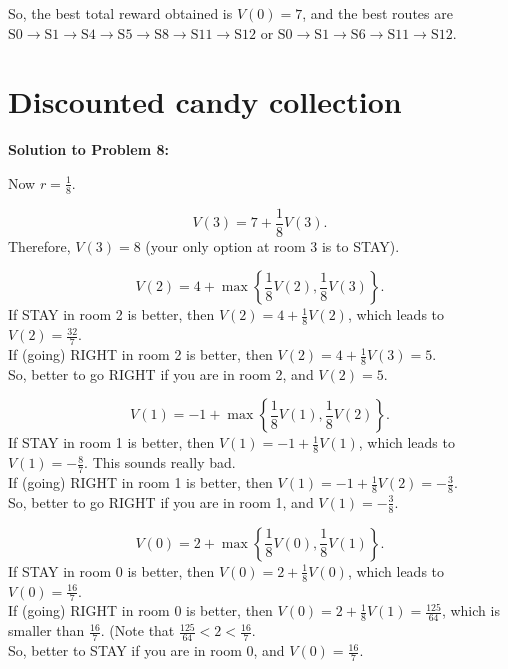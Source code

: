 \documentclass[a4paper, 12pt]{article}
\begin{document}
So, the best total reward obtained is $V(0) = 7$, and the best routes are $\text{S}0 \to \text{S}1 \to \text{S}4 \to \text{S}5 \to \text{S}8 \to \text{S}11 \to \text{S}12$ or $\text{S}0 \to \text{S}1 \to \text{S}6 \to \text{S}11 \to \text{S}12$.

\section{Discounted candy collection}

\textbf{Solution to Problem 8:}

Now $r = \frac{1}{8}$.

\begin{equation*}
V(3) = 7 + \frac{1}{8} V(3).
\end{equation*}
Therefore, $V(3) = 8$ (your only option at room 3 is to STAY).

\begin{equation*}
V(2) = 4 + \max \left\{ \frac{1}{8} V(2), \frac{1}{8} V(3) \right\}.
\end{equation*}
If STAY in room 2 is better, then $V(2) = 4 + \frac{1}{8} V(2)$, which leads to $V(2) = \frac{32}{7}$.\\
If (going) RIGHT in room 2 is better, then $V(2) = 4 + \frac{1}{8} V(3) = 5$.\\
So, better to go RIGHT if you are in room 2, and $V(2) = 5$.

\begin{equation*}
V(1) = -1 + \max \left\{ \frac{1}{8} V(1), \frac{1}{8} V(2) \right\}.
\end{equation*}
If STAY in room 1 is better, then $V(1) = -1 + \frac{1}{8} V(1)$, which leads to $V(1) = -\frac{8}{7}$. This sounds really bad.\\
If (going) RIGHT in room 1 is better, then $V(1) = -1 + \frac{1}{8} V(2) = -\frac{3}{8}$.\\
So, better to go RIGHT if you are in room 1, and $V(1) = - \frac{3}{8}$.

\begin{equation*}
V(0) = 2 + \max \left\{ \frac{1}{8} V(0), \frac{1}{8} V(1) \right\}.
\end{equation*}
If STAY in room 0 is better, then $V(0) = 2 + \frac{1}{8} V(0)$, which leads to $V(0) = \frac{16}{7}$.\\
If (going) RIGHT in room 0 is better, then $V(0) = 2 + \frac{1}{8} V(1) = \frac{125}{64}$, which is smaller than $\frac{16}{7}$. (Note that $\frac{125}{64} < 2 < \frac{16}{7}$.\\
So, better to STAY if you are in room 0, and $V(0) = \frac{16}{7}$.
\end{document}
